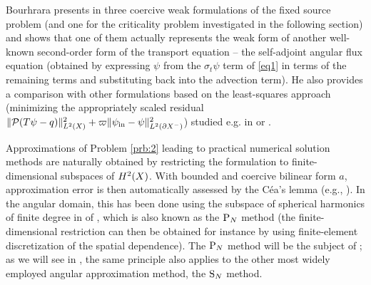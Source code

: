 Bourhrara presents in \cite{Bourhrara2} three coercive weak formulations of the fixed source problem (and
one for the criticality problem investigated in the following section) and shows that one of them actually represents
the weak form of another well-known second-order form of the transport equation -- the self-adjoint angular flux
equation (obtained by expressing $\psi$ from the $\sigma_t\psi$ term of \eqref{eq1} in terms of the remaining terms and substituting back into the advection term). He also provides a comparison with other 
formulations based on the least-squares approach (minimizing the appropriately scaled residual 
\mbox{$\norm[{\Lp[2](X)}]{\mathcal{P}(T \psi - q)}^2 + \varpi\norm[{\Lp[2](\pX[-])}]{\psi_{\text{in}} - \psi}^2$}) 
studied e.g. in \cite{Manteuffel} or \cite{Agoshkov}.

Approximations of Problem \ref{prb:2} leading to practical numerical solution methods are naturally obtained by
restricting the formulation to finite-dimensional subspaces of $\Hp[2](X)$. With bounded and coercive bilinear form $a$,
approximation error is then automatically assessed by the C{\' e}a's lemma (e.g., \cite[2.1.2]{Hermes-book2}). In the
angular domain, this has been done using the subspace of spherical harmonics of finite degree in \cite{bourhrara3} of \cite{Manteuffel}, which
is also known as the $\PN$ method (the finite-dimensional restriction can then be obtained for instance by using
finite-element discretization of the spatial dependence). The $\PN$ method will be the subject of ; as we
will see in , the same principle also applies to the other most widely employed angular approximation
method, the $\SN$ method.

